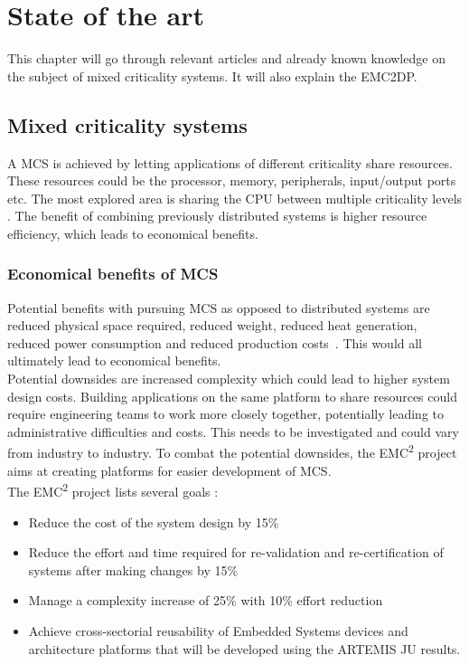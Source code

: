 \chapter{State of the art}
This chapter will go through relevant articles and already known knowledge on the subject of mixed criticality systems. It will also explain the EMC2DP.

\section{Mixed criticality systems}
A MCS is achieved by letting applications of different criticality share resources. These resources could be the processor, memory, peripherals, input/output ports etc. The most explored area is sharing the CPU between multiple criticality levels \cite{burns2016}. The benefit of combining previously distributed systems is higher resource efficiency, which leads to economical benefits.\\


\subsection{Economical benefits of MCS}
Potential benefits with pursuing MCS as opposed to distributed systems are reduced physical space required, reduced weight, reduced heat generation, reduced power consumption and reduced production costs~\cite{burns2016}. This would all ultimately lead to economical benefits.\\

Potential downsides are increased complexity which could lead to higher system design costs. Building applications on the same platform to share resources could require engineering teams to work more closely together, potentially leading to administrative difficulties and costs. This needs to be investigated and could vary from industry to industry. To combat the potential downsides, the EMC\textsuperscript{2} project aims at creating platforms for easier development of MCS.\\ %

The EMC\textsuperscript{2} project lists several goals \cite{website:emc2goals}:
\begin{itemize}
\item Reduce the cost of the system design by 15\%
\item Reduce the effort and time required for re-validation and re-certification of systems after making changes by 15\%
\item Manage a complexity increase of 25\% with 10\% effort reduction
\item Achieve cross-sectorial reusability of Embedded Systems devices and architecture platforms that will be developed using the ARTEMIS JU results.
\end{itemize}

